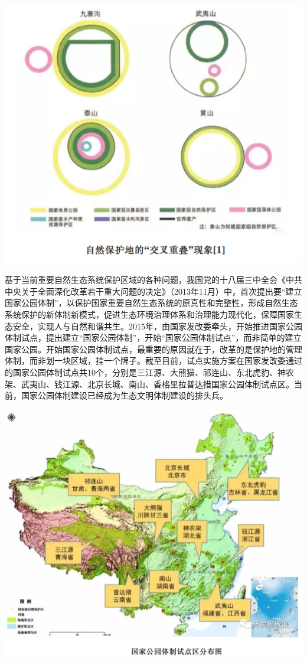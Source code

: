 \documentclass[]{book}
\begin{document}
\includegraphics[width=8.33in]{images/park3}

基于当前重要自然生态系统保护区域的各种问题，我国党的十八届三中全会《中共中央关于全面深化改革若干重大问题的决定》（2013年11月）中，首次提出要``建立国家公园体制''，以保护国家重要自然生态系统的原真性和完整性，形成自然生态系统保护的新体制新模式，促进生态环境治理体系和治理能力现代化，保障国家生态安全，实现人与自然和谐共生。2015年，由国家发改委牵头，开始推进国家公园体制试点，提出建立``国家公园体制''，开始``国家公园体制试点''，而非简单的建立国家公园。开始国家公园体制试点，最重要的原因就在于，改革的是保护地的管理体制，而非划一块区域，挂一个牌子。截至目前，试点实施方案在国家发改委通过的国家公园体制试点共10个，分别是三江源、大熊猫、祁连山、东北虎豹、神农架、武夷山、钱江源、北京长城、南山、香格里拉普达措国家公园体制试点区。当前，国家公园体制建设已经成为生态文明体制建设的排头兵。

\includegraphics[width=8.33in]{images/park4}
\end{document}
